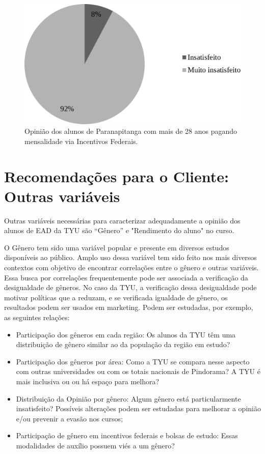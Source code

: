 \documentclass[10pt,a4paper,oneside]{article}
\newcommand{\para}{Paranapitanga\xspace}
\begin{document}
\begin{figure}[!h]
	\centering
	\includegraphics[width=.7\linewidth]{plots/q17c.pdf}
	\caption{Opinião dos alunos de \para com mais de 28 anos pagando mensalidade via Incentivos Federais.}
	\label{fig:opiniao-28anos-incFederaiso}
\end{figure}

\FloatBarrier{}
\section{Recomendações para o Cliente: Outras variáveis}
\label{section:outras-variaveis}
Outras variáveis necessárias para caracterizar adequadamente a opinião dos alunos de EAD da TYU são  ``Gênero'' e "Rendimento do aluno" no curso.

O Gênero tem sido uma variável popular e presente em diversos estudos disponíveis ao público. 
Amplo uso dessa variável tem sido feito nos mais diversos contextos com objetivo de encontrar correlações entre o gênero e outras variáveis. Essa busca por correlações frequentemente pode ser associada a verificação da desigualdade de gêneros. No caso da TYU, a verificação dessa desigualdade pode motivar políticas que a reduzam, e se verificada igualdade de gênero, os resultados podem ser usados em marketing. Podem ser estudadas, por exemplo, as seguintes relações:
\begin{itemize}
	\item Participação dos gêneros em cada região: Os alunos da TYU têm uma distribuição de gênero similar ao da população da região em estudo?
	\item Participação dos gêneros por área: Como a TYU se compara nesse aspecto com outras universidades ou com os totais nacionais de Pindorama? A TYU é mais inclusiva ou ou há espaço para melhora?
	\item Distribuição da Opinião por gênero: Algum gênero está particularmente insatisfeito? Possíveis alterações podem ser estudadas para melhorar a opinião e/ou prevenir a evasão nos cursos;
	\item Participação de gênero em incentivos federais e bolsas de estudo: Essas modalidades de auxílio possuem viés a um gênero?
\end{itemize}
\end{document}
